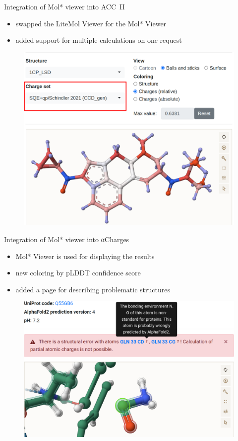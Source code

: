 \documentclass[
]{beamer}
\begin{document}
\begin{frame}{Integration of Mol* viewer into ACC~II}
  \begin{itemize}
    \item swapped the LiteMol Viewer for the Mol* Viewer
    \item added support for multiple calculations on one request
  \end{itemize}
  \begin{figure}
    \includegraphics[width=1\textwidth,height=0.75\textheight,keepaspectratio]{images/acc2.png}
  \end{figure}
\end{frame}

\begin{frame}{Integration of Mol* viewer into αCharges}
  \begin{itemize}
    \item Mol* Viewer is used for displaying the results
    \item new coloring by pLDDT confidence score
    \item added a page for describing problematic structures
  \end{itemize}
  \begin{figure}
    \includegraphics[width=1\textwidth,height=0.65\textheight,keepaspectratio]{images/focus.png}
  \end{figure}
  \end{frame}
\end{document}
